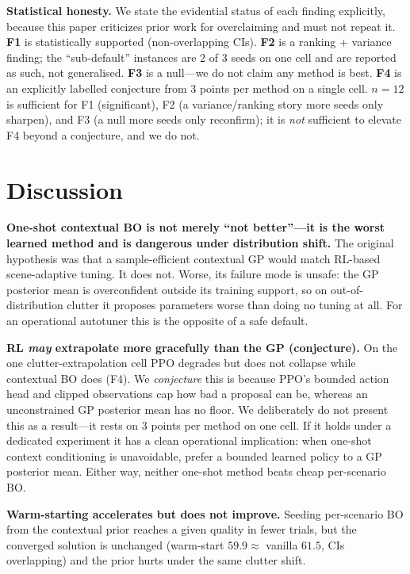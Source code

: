 \documentclass[11pt]{article}
\begin{document}
\textbf{Statistical honesty.} We state the evidential status of each
finding explicitly, because this paper criticizes prior work for
overclaiming and must not repeat it. \textbf{F1} is statistically
supported (non-overlapping CIs). \textbf{F2} is a ranking + variance
finding; the ``sub-default'' instances are 2 of 3 seeds on one cell and
are reported as such, not generalised. \textbf{F3} is a null---we do
not claim any method is best. \textbf{F4} is an explicitly labelled
conjecture from 3 points per method on a single cell. $n{=}12$ is
sufficient for F1 (significant), F2 (a variance/ranking story more seeds
only sharpen), and F3 (a null more seeds only reconfirm); it is
\emph{not} sufficient to elevate F4 beyond a conjecture, and we do not.

\section{Discussion}
\label{sec:discussion}

\textbf{One-shot contextual BO is not merely ``not better''---it is the
worst learned method and is dangerous under distribution shift.} The
original hypothesis was that a sample-efficient contextual GP would
match RL-based scene-adaptive tuning. It does not. Worse, its failure
mode is unsafe: the GP posterior mean is overconfident outside its
training support, so on out-of-distribution clutter it proposes
parameters worse than doing no tuning at all. For an operational
autotuner this is the opposite of a safe default.

\textbf{RL \emph{may} extrapolate more gracefully than the GP
(conjecture).} On the one clutter-extrapolation cell PPO degrades but
does not collapse while contextual BO does (F4). We \emph{conjecture}
this is because PPO's bounded action head and clipped observations cap
how bad a proposal can be, whereas an unconstrained GP posterior mean
has no floor. We deliberately do not present this as a result---it
rests on 3 points per method on one cell. If it holds under a dedicated
experiment it has a clean operational implication: when one-shot context
conditioning is unavoidable, prefer a bounded learned policy to a GP
posterior mean. Either way, neither one-shot method beats cheap
per-scenario BO.

\textbf{Warm-starting accelerates but does not improve.} Seeding
per-scenario BO from the contextual prior reaches a given quality in
fewer trials, but the converged solution is unchanged (warm-start
$59.9\approx$ vanilla $61.5$, CIs overlapping) and the prior hurts under
the same clutter shift.
\end{document}
